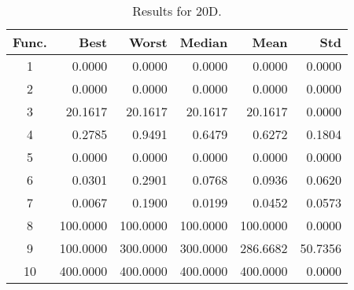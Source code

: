 \begin{table}[ht]
\centering
\caption{ Results for 20D. }
\label{tab:20D}
\begin{tabular}{crrrrr}
\hline
{Func.} & Best & Worst & Median & Mean & Std \\
\hline
1 & 0.0000 & 0.0000 & 0.0000 & 0.0000 & 0.0000 \\
2 & 0.0000 & 0.0000 & 0.0000 & 0.0000 & 0.0000 \\
3 & 20.1617 & 20.1617 & 20.1617 & 20.1617 & 0.0000 \\
4 & 0.2785 & 0.9491 & 0.6479 & 0.6272 & 0.1804 \\
5 & 0.0000 & 0.0000 & 0.0000 & 0.0000 & 0.0000 \\
6 & 0.0301 & 0.2901 & 0.0768 & 0.0936 & 0.0620 \\
7 & 0.0067 & 0.1900 & 0.0199 & 0.0452 & 0.0573 \\
8 & 100.0000 & 100.0000 & 100.0000 & 100.0000 & 0.0000 \\
9 & 100.0000 & 300.0000 & 300.0000 & 286.6682 & 50.7356 \\
10 & 400.0000 & 400.0000 & 400.0000 & 400.0000 & 0.0000 \\
\hline
\end{tabular}
\end{table}
